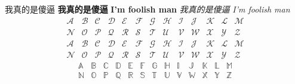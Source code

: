 \begin{tcolorbox}
    \begin{center}
                    我真的是傻逼
            \textbf{我真的是傻逼}
            \textbf{I'm foolish man}
            \textit{我真的是傻逼}
            \textit{I'm foolish man}\\
                                            \[
                                \begin{array}{ccccccccccccc}
                                \mathcal{A} & \mathcal{B} & \mathcal{C} & \mathcal{D} & \mathcal{E} & \mathcal{F} & \mathcal{G} &
                                \mathcal{H} & \mathcal{I} & \mathcal{J} & \mathcal{K} & \mathcal{L} & \mathcal{M} \\
                                \mathcal{N} & \mathcal{O} & \mathcal{P} & \mathcal{Q} & \mathcal{R} & \mathcal{S} & \mathcal{T} &
                                \mathcal{U} & \mathcal{V} & \mathcal{W} & \mathcal{X} & \mathcal{Y} & \mathcal{Z}
                                \end{array}
                                \]
                                \[
                                \begin{array}{ccccccccccccc}
                                \mathscr{A} & \mathscr{B} & \mathscr{C} & \mathscr{D} & \mathscr{E} & \mathscr{F} & \mathscr{G} &
                                \mathscr{H} & \mathscr{I} & \mathscr{J} & \mathscr{K} & \mathscr{L} & \mathscr{M} \\
                                \mathscr{N} & \mathscr{O} & \mathscr{P} & \mathscr{Q} & \mathscr{R} & \mathscr{S} & \mathscr{T} &
                                \mathscr{U} & \mathscr{V} & \mathscr{W} & \mathscr{X} & \mathscr{Y} & \mathscr{Z}
                                \end{array}
                                \]
                                \[
                                \begin{array}{ccccccccccccc}
                                \mathbb{A} & \mathbb{B} & \mathbb{C} & \mathbb{D} & \mathbb{E} & \mathbb{F} & \mathbb{G} &
                                \mathbb{H} & \mathbb{I} & \mathbb{J} & \mathbb{K} & \mathbb{L} & \mathbb{M} \\
                                \mathbb{N} & \mathbb{O} & \mathbb{P} & \mathbb{Q} & \mathbb{R} & \mathbb{S} & \mathbb{T} &
                                \mathbb{U} & \mathbb{V} & \mathbb{W} & \mathbb{X} & \mathbb{Y} & \mathbb{Z}
                                \end{array}
                                \]

            \end{center}
    \end{tcolorbox}
